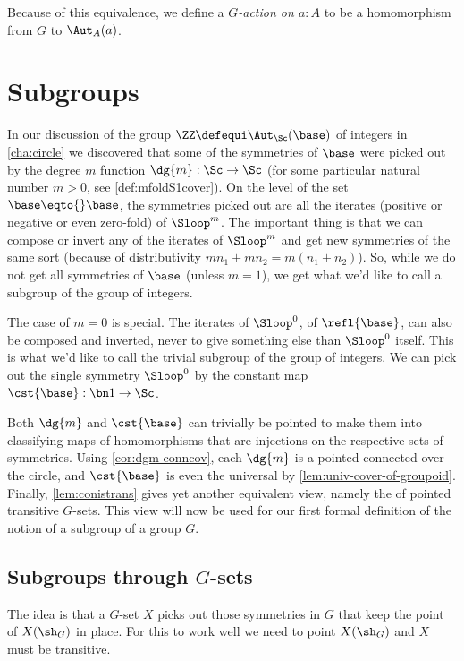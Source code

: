 Because of this equivalence,
we define a \emph{$G$-action on $a:A$}
to be a homomorphism from $G$ to $\Aut_A(a)$.

\section{Subgroups}
\label{sec:subgroups}
In our discussion of the group $\ZZ\defequi\Aut_{\Sc}(\base)$ of integers
in \cref{cha:circle} we discovered that some of the symmetries of $\base$
were picked out by the degree $m$ function $\dg{m}: \Sc\to\Sc$
(for some particular natural number $m>0$, see \cref{def:mfoldS1cover}).  
On the level of the set $\base\eqto{}\base$, the symmetries picked out are
all the iterates (positive or negative or even zero-fold) of $\Sloop^m$.
The important thing is that we can compose or invert any of the iterates
of $\Sloop^m$ and get new symmetries of the same sort (because of
distributivity $mn_1+mn_2=m(n_1+n_2)$). So, while we do not get all
symmetries of $\base$ (unless $m=1$), we get what we'd like to call 
a subgroup of the group of integers.

The case of $m=0$ is special. The iterates of $\Sloop^0$, \ie of
$\refl{\base}$, can also be composed and inverted, never to give
something else than $\Sloop^0$ itself. This is what we'd like to call
the trivial subgroup of the group of integers. 
We can pick out the single symmetry $\Sloop^0$
by the constant map $\cst{\base} : \bn 1 \to \Sc$.

Both $\dg{m}$ and $\cst{\base}$ can trivially be pointed to make them
into classifying maps of homomorphisms that are injections on the
respective sets of symmetries. Using \cref{cor:dgm-conncov},
each $\dg{m}$ is a pointed connected \covering over the circle, and
$\cst{\base}$ is even the universal \covering by 
\cref{lem:univ-cover-of-groupoid}. Finally, \cref{lem:conistrans}
gives yet another equivalent view, namely the of pointed transitive
$G$-sets. This view will now be used for our first formal definition
of the notion of a subgroup of a group $G$.

\subsection{Subgroups through $G$-sets}

The idea is that a $G$-set $X$ picks out those symmetries in $G$
that keep the point of $X(\sh_G)$ in place. For this to work well
we need to point $X(\sh_G)$ and $X$ must be transitive.

